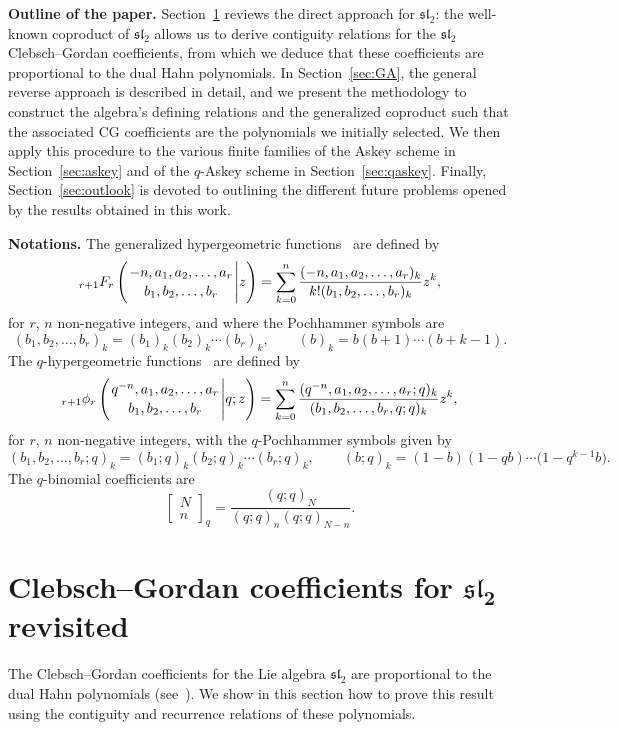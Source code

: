\documentclass[pdftex]{sigma}
\numberwithin{equation}{section}
\theoremstyle{definition}
\begin{document}
{\bf Outline of the paper.} Section~\ref{sec:sl2} reviews the direct approach for $\mathfrak{sl}_2$: the well-known coproduct of $\mathfrak{sl}_2$ allows us to derive contiguity relations for the $\mathfrak{sl}_2$ Clebsch--Gordan coefficients, from which we deduce that these coefficients are proportional to the dual Hahn polynomials.
In Section~\ref{sec:GA}, the general reverse approach is described in detail, and we present the methodology to construct the algebra's defining relations and the generalized coproduct such that the associated CG coefficients are the polynomials we initially selected.
We then apply this procedure to the various finite families of the Askey scheme in Section~\ref{sec:askey} and of the $q$-Askey scheme in Section~\ref{sec:qaskey}.
Finally, Section~\ref{sec:outlook} is devoted to outlining the different future problems opened by the results obtained in this work.

{\bf Notations.} The generalized hypergeometric functions~\cite{GR,KLS10} are defined by
\[
{}_{r+1}F_r\left({{-n, a_1, a_2, \dots, a_{r} }\atop
{b_1, b_2, \dots, b_{r} }} \Bigg\vert  z\right)=\sum_{k=0}^{n}
\frac{(-n,a_1,a_2,\dots,a_r)_k}{k!(b_1,b_2,\dots,b_r)_k}z^k,
\]
for $r$, $n$ non-negative integers,
and where the Pochhammer symbols are
\[
(b_1,b_2,\dots,b_r)_k=(b_1)_k(b_2)_k\cdots (b_r)_k,\qquad (b)_k=b(b+1)\cdots (b+k-1).
\]
The $q$-hypergeometric functions~\cite{GR,KLS10} are defined by
\[
{}_{r+1}\phi_r\left({{q^{-n}, a_1, a_2, \dots, a_{r} }\atop
{b_1, b_2, \dots, b_{r} }} \Bigg\vert  q;z\right)=\sum_{k=0}^{n}
\frac{(q^{-n},a_1,a_2,\dots,a_r;q)_k}{(b_1,b_2,\dots,b_r,q;q)_k}z^k,
\]
for $r$, $n$ non-negative integers,
with the $q$-Pochhammer symbols given by
\[
(b_1,b_2,\dots,b_r;q)_k=(b_1;q)_k(b_2;q)_k\cdots (b_r;q)_k,\qquad (b;q)_k=(1-b)(1-qb)\cdots \bigl(1-q^{k-1}b\bigr).
\]
The $q$-binomial coefficients are
\[
 \left[\begin{array}{c}
 N \\
 n
\end{array}\right]_q =\frac{(q;q)_N}{(q;q)_n(q;q)_{N-n}}.
\]

\section[Clebsch--Gordan coefficients for sl\_2 revisited]{Clebsch--Gordan coefficients for $\boldsymbol{\mathfrak{sl}_2}$ revisited}\label{sec:sl2}

The Clebsch--Gordan coefficients for the Lie algebra $\mathfrak{sl}_2$ are proportional to the dual Hahn polynomials (see~\cite{Koor,NUV,Racah}). We show in this section how to prove this result using the contiguity and recurrence relations of these polynomials.
\end{document}
